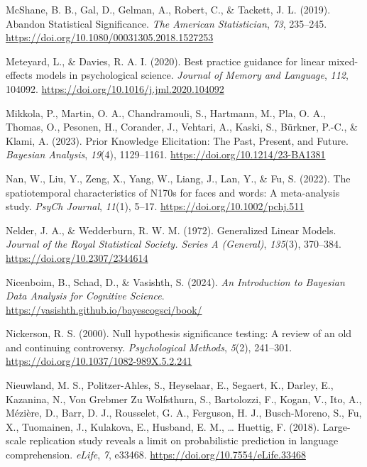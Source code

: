 \documentclass[
  doc,12pt,floatsintext]{apa7}
\newlength{\cslhangindent}
\newenvironment{CSLReferences}[2] %
 {\begin{list}{}{%
  \setlength{\itemindent}{0pt}
  \setlength{\leftmargin}{0pt}
  \setlength{\parsep}{0pt}
  \ifodd #1
   \setlength{\leftmargin}{\cslhangindent}
   \setlength{\itemindent}{-1\cslhangindent}
  \fi
  \setlength{\itemsep}{#2\baselineskip}}}
 {\end{list}}
\begin{document}
\begin{CSLReferences}{1}{0}
McShane, B. B., Gal, D., Gelman, A., Robert, C., \& Tackett, J. L. (2019). Abandon {Statistical Significance}. \emph{The American Statistician}, \emph{73}, 235--245. \url{https://doi.org/10.1080/00031305.2018.1527253}

Meteyard, L., \& Davies, R. A. I. (2020). Best practice guidance for linear mixed-effects models in psychological science. \emph{Journal of Memory and Language}, \emph{112}, 104092. \url{https://doi.org/10.1016/j.jml.2020.104092}

Mikkola, P., Martin, O. A., Chandramouli, S., Hartmann, M., Pla, O. A., Thomas, O., Pesonen, H., Corander, J., Vehtari, A., Kaski, S., Bürkner, P.-C., \& Klami, A. (2023). Prior {Knowledge Elicitation}: {The Past}, {Present}, and {Future}. \emph{Bayesian Analysis}, \emph{19}(4), 1129--1161. \url{https://doi.org/10.1214/23-BA1381}

Nan, W., Liu, Y., Zeng, X., Yang, W., Liang, J., Lan, Y., \& Fu, S. (2022). The spatiotemporal characteristics of {N170s} for faces and words: {A} meta-analysis study. \emph{PsyCh Journal}, \emph{11}(1), 5--17. \url{https://doi.org/10.1002/pchj.511}

Nelder, J. A., \& Wedderburn, R. W. M. (1972). Generalized {Linear Models}. \emph{Journal of the Royal Statistical Society. Series A (General)}, \emph{135}(3), 370--384. \url{https://doi.org/10.2307/2344614}

Nicenboim, B., Schad, D., \& Vasishth, S. (2024). \emph{An {Introduction} to {Bayesian Data Analysis} for {Cognitive Science}}. \url{https://vasishth.github.io/bayescogsci/book/}

Nickerson, R. S. (2000). Null hypothesis significance testing: {A} review of an old and continuing controversy. \emph{Psychological Methods}, \emph{5}(2), 241--301. \url{https://doi.org/10.1037/1082-989X.5.2.241}

Nieuwland, M. S., Politzer-Ahles, S., Heyselaar, E., Segaert, K., Darley, E., Kazanina, N., Von Grebmer Zu Wolfsthurn, S., Bartolozzi, F., Kogan, V., Ito, A., Mézière, D., Barr, D. J., Rousselet, G. A., Ferguson, H. J., Busch-Moreno, S., Fu, X., Tuomainen, J., Kulakova, E., Husband, E. M., \ldots{} Huettig, F. (2018). Large-scale replication study reveals a limit on probabilistic prediction in language comprehension. \emph{eLife}, \emph{7}, e33468. \url{https://doi.org/10.7554/eLife.33468}


\end{CSLReferences}
\end{document}
